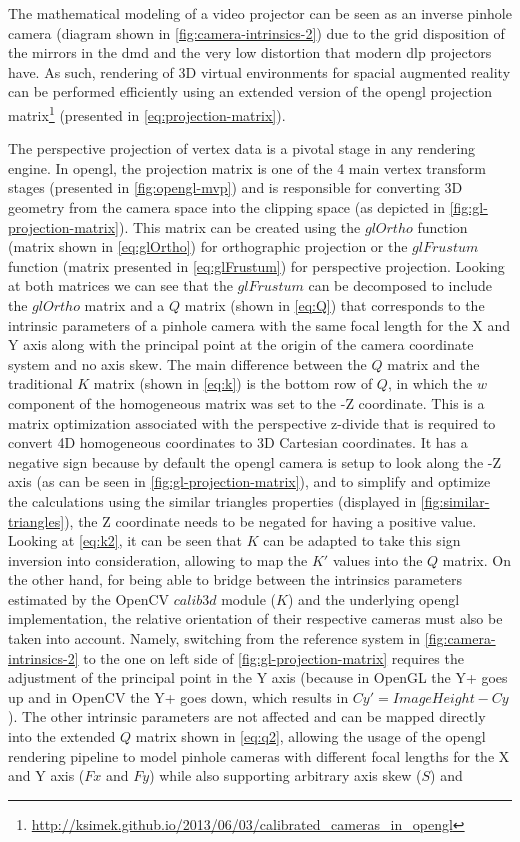The mathematical modeling of a video projector can be seen as an inverse pinhole camera (diagram shown in \cref{fig:camera-intrinsics-2}) due to the grid disposition of the mirrors in the \gls{dmd} and the very low distortion that modern \gls{dlp} projectors have. As such, rendering of 3D virtual environments for spacial augmented reality can be performed efficiently using an extended version of the \gls{opengl} projection matrix\footnote{\url{http://ksimek.github.io/2013/06/03/calibrated\_cameras\_in\_opengl}} (presented in \cref{eq:projection-matrix}).

The perspective projection of vertex data is a pivotal stage in any rendering engine. In \gls{opengl}, the projection matrix is one of the 4 main vertex transform stages (presented in \cref{fig:opengl-mvp}) and is responsible for converting 3D geometry from the camera space into the clipping space (as depicted in \cref{fig:gl-projection-matrix}). This matrix can be created using the $glOrtho$ function (matrix shown in \cref{eq:glOrtho}) for orthographic projection or the $glFrustum$ function (matrix presented in \cref{eq:glFrustum}) for perspective projection. Looking at both matrices we can see that the $glFrustum$ can be decomposed to include the $glOrtho$ matrix and a $Q$ matrix (shown in \cref{eq:Q}) that corresponds to the intrinsic parameters of a pinhole camera with the same focal length for the X and Y axis along with the principal point at the origin of the camera coordinate system and no axis skew. The main difference between the $Q$ matrix and the traditional $K$ matrix \cite{Hartley2003} (shown in \cref{eq:k}) is the bottom row of $Q$, in which the $w$ component of the homogeneous matrix was set to the -Z coordinate. This is a matrix optimization associated with the perspective z-divide that is required to convert 4D homogeneous coordinates to 3D Cartesian coordinates. It has a negative sign because by default the \gls{opengl} camera is setup to look along the -Z axis (as can be seen in \cref{fig:gl-projection-matrix}), and to simplify and optimize the calculations using the similar triangles properties (displayed in \cref{fig:similar-triangles}), the Z coordinate needs to be negated for having a positive value. Looking at \cref{eq:k2}, it can be seen that $K$ can be adapted to take this sign inversion into consideration, allowing to map the $K'$ values into the $Q$ matrix. On the other hand, for being able to bridge between the intrinsics parameters estimated by the OpenCV $calib3d$ module ($K$) and the underlying \gls{opengl} implementation, the relative orientation of their respective cameras must also be taken into account. Namely, switching from the reference system in \cref{fig:camera-intrinsics-2} to the one on left side of \cref{fig:gl-projection-matrix} requires the adjustment of the principal point in the Y axis (because in OpenGL the Y+ goes up and in OpenCV the Y+ goes down, which results in $Cy'=ImageHeight-Cy$). The other intrinsic parameters are not affected and can be mapped directly into the extended $Q$ matrix shown in \cref{eq:q2}, allowing the usage of the \gls{opengl} rendering pipeline to model pinhole cameras with different focal lengths for the X and Y axis ($Fx$ and $Fy$) while also supporting arbitrary axis skew ($S$) and 